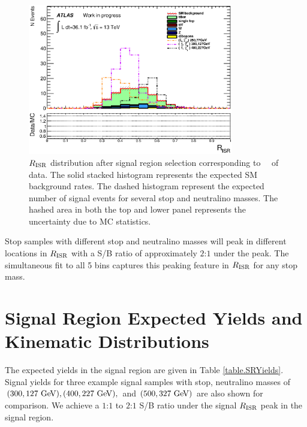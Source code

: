 \begin{figure}[h!]
  \begin{center}
     \includegraphics[width=0.80\textwidth]{figures/plotSR/SR_ND1_RISR_7SR.eps}
  \caption[~$\RISR$ distribution after signal region selection corresponding to \intlumi\ \ifb\ of data]{ $\RISR$ distribution after signal region selection corresponding to \intlumi\ \ifb\ of data. The solid stacked histogram represents the expected SM background rates. The dashed histogram represent the expected number of signal events for several stop and neutralino masses. The hashed area in both the top and lower panel represents the uncertainty due to MC statistics.}
  \label{fig:SR:RISR1}
  \end{center}
\end{figure}

\indent Stop samples with different stop and neutralino masses will peak in different locations in $\RISR$ with a S/B ratio of approximately $2$:$1$ under the peak.  The simultaneous fit to all 5 bins captures this peaking feature in $\RISR$ for any stop mass.  \\

\section{Signal Region Expected Yields and Kinematic Distributions}
\label{sec:SR:Yields}

\indent The expected yields in the signal region are given in Table \ref{table.SRYields}.  Signal yields for three example signal samples with stop, neutralino masses of $(300,127 \gev), (400,227\gev), $ and $(500,327 \gev)$ are also shown for comparison.  We achieve a $1$:$1$ to $2$:$1$ S/B ratio under the signal $\RISR$ peak in the signal region. \\

